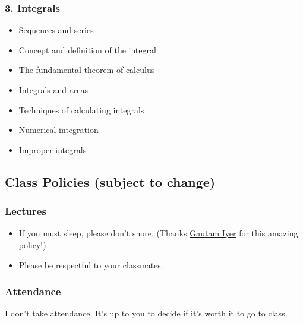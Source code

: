 \documentclass[
]{article}
\providecommand{\tightlist}{%
  \setlength{\itemsep}{0pt}\setlength{\parskip}{0pt}}
\begin{document}
\hypertarget{integrals}{%
\subsubsection*{3. Integrals}\label{integrals}}

\begin{itemize}
\item
  Sequences and series
\item
  Concept and definition of the integral
\item
  The fundamental theorem of calculus
\item
  Integrals and areas
\item
  Techniques of calculating integrals
\item
  Numerical integration
\item
  Improper integrals
\end{itemize}

\hypertarget{class-policies-subject-to-change}{%
\subsection*{Class Policies (subject to change)}\label{class-policies-subject-to-change}}

\hypertarget{lectures}{%
\subsubsection*{Lectures}\label{lectures}}

\begin{itemize}
\tightlist
\item
  If you must sleep, please don't snore. (Thanks \href{https://www.math.cmu.edu/~gautam/}{Gautam Iyer} for this amazing policy!)
\item
  Please be respectful to your classmates.
\end{itemize}

\hypertarget{attendance}{%
\subsubsection*{Attendance}\label{attendance}}

I don't take attendance. It's up to you to decide if it's worth it to go to
class.
\end{document}

